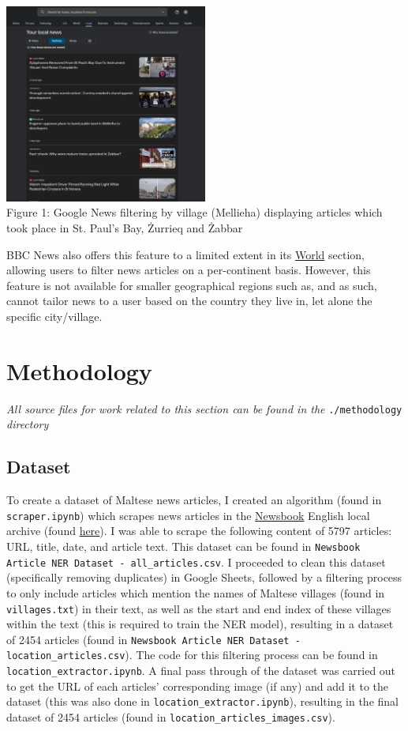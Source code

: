 \documentclass[a4paper, oneside, 11pt]{article}
\begin{document}
\begin{multicols*}{2}
  \begin{center}
    \includegraphics[width=0.5\textwidth]{./figures/googlenewsmellieha.png} \\
    Figure 1: Google News filtering by village (Mellieha) displaying articles which took place in St. Paul's Bay, Żurrieq and Żabbar
  \end{center}
  

  BBC News also offers this feature to a limited extent in its \href{https://www.bbc.com/news/world}{World} section, allowing users to filter news articles on a per-continent basis. However, this feature is not available for smaller geographical regions such as, and as such, cannot tailor news to a user based on the country they live in, let alone the specific city/village.

  
  \section{Methodology}
  \textit{All source files for work related to this section can be found in the} \verb|./methodology| \textit{directory}

  \subsection{Dataset}
  To create a dataset of Maltese news articles, I created an algorithm (found in \verb|scraper.ipynb|) which scrapes news articles in the \href{https://newsbook.com.mt/}{Newsbook} English local archive (found \href{https://newsbook.com.mt/en/category/news/local/}{here}). I was able to scrape the following content of 5797 articles: URL, title, date, and article text. This dataset can be found in \verb|Newsbook Article NER Dataset - all_articles.csv|. I proceeded to clean this dataset (specifically removing duplicates) in Google Sheets, followed by a filtering process to only include articles which mention the names of Maltese villages (found in \verb|villages.txt|) in their text, as well as the start and end index of these villages within the text (this is required to train the NER model), resulting in a dataset of 2454 articles (found in \verb|Newsbook Article NER Dataset - location_articles.csv|). The code for this filtering process can be found in \verb|location_extractor.ipynb|. A final pass through of the dataset was carried out to get the URL of each articles' corresponding image (if any) and add it to the dataset (this was also done in \verb|location_extractor.ipynb|), resulting in the final dataset of 2454 articles (found in \verb|location_articles_images.csv|).



\end{multicols*}
\end{document}
